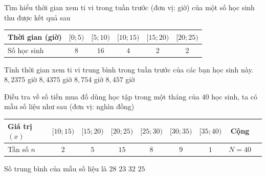 \begin{ex}%
	Tìm hiểu thời gian xem ti vi trong tuần  trước (đơn vị: giờ) của một số học sinh thu được kết quả sau
	\begin{center}
		\begin{tabular}{|l|c|c|c|c|c|}
			\hline Thời gian (giờ) & {$[0;5)$} & {$ [5;10)$} & {$[10;15) $} & {$[15;20)$} & {$[20;25)$}\\ 
			\hline Số học sinh& $8$ & $16$ &  $4$ & $2$& $2$\\
			\hline 
		\end{tabular}
	\end{center}
	Tính thời gian xem ti vi trung bình trong  tuần trước của các bạn học sinh này.
	\choice 
		{ $8{,}2375$ giờ} 
		 { \True $8{,}4375$ giờ}
		{ $8{,}754$ giờ} 
		{ $8{,}457$ giờ} 
\end{ex}

\begin{ex}%
	Điều tra về số tiền mua đồ dùng học tập trong một tháng của $40$ học sinh, ta có mẫu số  liệu như sau (đơn vị: nghìn đồng)
	\begin{center}
		\begin{tabular}{|l|c|c|c|c|c|c|c|c|}
			\hline Giá trị  $(x)$ & {$[10;15) $} & {$[15;20)$} & {$[20;25)$}& {$[25;30)$} & {$ [30;35)$} & {$[35;40) $} & Cộng\\
			\hline  Tần số $n$ & $2$ & $5$ & $15$ & $8$& $9$& $1$& $N=40$\\
			\hline 
		\end{tabular}
	\end{center}
	Số trung bình của mẫu số liệu  là
	 \choice
		{  $28$}
		 { $23$}
		{  $32$}
		{ \True $25$} 
\end{ex}

